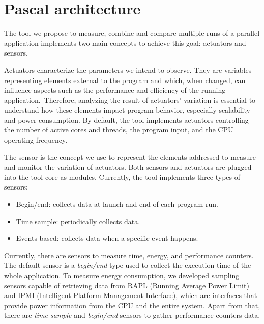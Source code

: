 %

\section{Pascal architecture} \label{sec:pascal_architecture}
The tool we propose to measure, combine and compare multiple runs of a parallel application implements two main concepts to achieve this goal: actuators and sensors.

Actuators characterize the parameters we intend to observe. They are variables representing elements external to the program and which, when changed, can influence aspects such as the performance and efficiency of the running application.~Therefore, analyzing the result of actuators' variation is essential to understand how these elements impact program behavior, especially scalability and power consumption. By default, the tool implements actuators controlling the number of active cores and threads, the program input, and the CPU operating frequency.

The sensor is the concept we use to represent the elements addressed to measure and monitor the variation of actuators. Both sensors and actuators are plugged into the tool core as modules. Currently, the tool implements three types of sensors:

\begin{itemize}
	\item Begin/end: collects data at launch and end of each program run.
	\item Time sample: periodically collects data.
	\item Events-based: collects data when a specific event happens.
\end{itemize}

Currently, there are sensors to measure time, energy, and performance counters. The default sensor is a \textit{begin/end} type used to collect the execution time of the whole application. To measure energy consumption, we developed sampling sensors capable of retrieving data from RAPL (Running Average Power Limit) and IPMI (Intelligent Platform Management Interface), which are interfaces that provide power information from the CPU
and the entire system. Apart from that, there are \textit{time sample} and \textit{begin/end} sensors to gather performance counters data.

